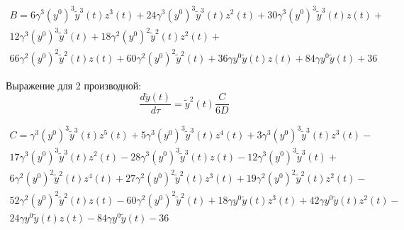 \documentclass[12pt, letterpaper]{article}
\begin{document}
\begin{equation}
	\begin{aligned}
		B = 6 \gamma^{3} \left(y^{0}\right)^{3} \tilde{y}^{3}{\left(t \right)} z^{3}{\left(t \right)} + 24 \gamma^{3} \left(y^{0}\right)^{3} \tilde{y}^{3}{\left(t \right)} z^{2}{\left(t \right)} + 30 \gamma^{3} \left(y^{0}\right)^{3} \tilde{y}^{3}{\left(t \right)} z{\left(t \right)} + \\
		12 \gamma^{3} \left(y^{0}\right)^{3} \tilde{y}^{3}{\left(t \right)} + 18 \gamma^{2} \left(y^{0}\right)^{2} \tilde{y}^{2}{\left(t \right)} z^{2}{\left(t \right)} + \\
		66 \gamma^{2} \left(y^{0}\right)^{2} \tilde{y}^{2}{\left(t \right)} z{\left(t \right)} + 60 \gamma^{2} \left(y^{0}\right)^{2} \tilde{y}^{2}{\left(t \right)} + 36 \gamma y^{0} \tilde{y}{\left(t \right)} z{\left(t \right)} + 84 \gamma y^{0} \tilde{y}{\left(t \right)} + 36
	\end{aligned}
\end{equation}


Выражение для 2 производной:
\begin{equation}
	\frac{d \tilde{y}(t)}{d \tau} = \tilde{y}^{2}{\left(t \right)} \frac{C}{6 D}
\end{equation}

\begin{equation}
	\begin{aligned}
		C = \gamma^{3} \left(y^{0}\right)^{3} \tilde{y}^{3}{\left(t \right)} z^{5}{\left(t \right)} + 5 \gamma^{3} \left(y^{0}\right)^{3} \tilde{y}^{3}{\left(t \right)} z^{4}{\left(t \right)} + 3 \gamma^{3} \left(y^{0}\right)^{3} \tilde{y}^{3}{\left(t \right)} z^{3}{\left(t \right)} - \\
		17 \gamma^{3} \left(y^{0}\right)^{3} \tilde{y}^{3}{\left(t \right)} z^{2}{\left(t \right)} - 28 \gamma^{3} \left(y^{0}\right)^{3} \tilde{y}^{3}{\left(t \right)} z{\left(t \right)} - 12 \gamma^{3} \left(y^{0}\right)^{3} \tilde{y}^{3}{\left(t \right)} + \\
		6 \gamma^{2} \left(y^{0}\right)^{2} \tilde{y}^{2}{\left(t \right)} z^{4}{\left(t \right)} + 27 \gamma^{2} \left(y^{0}\right)^{2} \tilde{y}^{2}{\left(t \right)} z^{3}{\left(t \right)} + 19 \gamma^{2} \left(y^{0}\right)^{2} \tilde{y}^{2}{\left(t \right)} z^{2}{\left(t \right)} - \\
		52 \gamma^{2} \left(y^{0}\right)^{2} \tilde{y}^{2}{\left(t \right)} z{\left(t \right)} - 60 \gamma^{2} \left(y^{0}\right)^{2} \tilde{y}^{2}{\left(t \right)} + 18 \gamma y^{0} \tilde{y}{\left(t \right)} z^{3}{\left(t \right)} + 42 \gamma y^{0} \tilde{y}{\left(t \right)} z^{2}{\left(t \right)} - \\
		24 \gamma y^{0} \tilde{y}{\left(t \right)} z{\left(t \right)} - 84 \gamma y^{0} \tilde{y}{\left(t \right)} - 36
	\end{aligned}
\end{equation}
\end{document}
